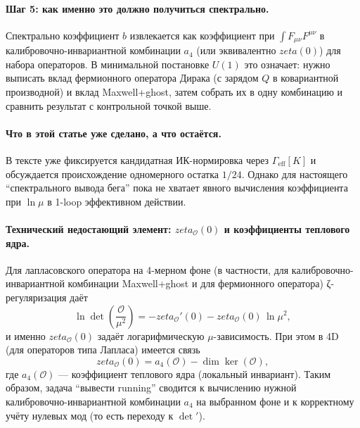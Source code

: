 \documentclass[12pt]{article}
\def\zeta{zeta}%
\begin{document}
\paragraph{Шаг 5: как именно это должно получиться спектрально.}
Спектрально коэффициент $b$ извлекается как коэффициент при $\int F_{\mu\nu}F^{\mu\nu}$ в калибровочно-инвариантной комбинации $a_4$ (или эквивалентно $\zeta(0)$) для набора операторов.
В минимальной постановке $U(1)$ это означает: нужно выписать вклад фермионного оператора Дирака (с зарядом $Q$ в ковариантной производной) и вклад Maxwell+ghost, затем собрать их в одну комбинацию и сравнить результат с контрольной точкой выше.

\paragraph{Что в этой статье уже сделано, а что остаётся.}
В тексте уже фиксируется кандидатная ИК-нормировка через $\Gamma_{\mathrm{eff}}[K]$ и обсуждается происхождение одномерного остатка $1/24$.
Однако для настоящего ``спектрального вывода бега'' пока не хватает явного вычисления коэффициента при $\ln\mu$ в 1-loop эффективном действии.

\paragraph{Технический недостающий элемент: $\zeta_{\mathcal{O}}(0)$ и коэффициенты теплового ядра.}
Для лапласовского оператора на 4-мерном фоне (в частности, для калибровочно-инвариантной комбинации Maxwell+ghost и для фермионного оператора) ζ-регуляризация даёт
\begin{equation}
\ln\det\!\left(\frac{\mathcal{O}}{\mu^2}\right)= -\zeta_{\mathcal{O}}'(0)-\zeta_{\mathcal{O}}(0)\,\ln \mu^2,
\end{equation}
и именно $\zeta_{\mathcal{O}}(0)$ задаёт логарифмическую $\mu$-зависимость.
При этом в 4D (для операторов типа Лапласа) имеется связь
\begin{equation}
\zeta_{\mathcal{O}}(0)=a_4(\mathcal{O})-\dim\ker(\mathcal{O}),
\end{equation}
где $a_4(\mathcal{O})$ --- коэффициент теплового ядра (локальный инвариант).
Таким образом, задача ``вывести running'' сводится к вычислению нужной калибровочно-инвариантной комбинации $a_4$ на выбранном фоне и к корректному учёту нулевых мод (то есть переходу к $\det'$).
\end{document}
